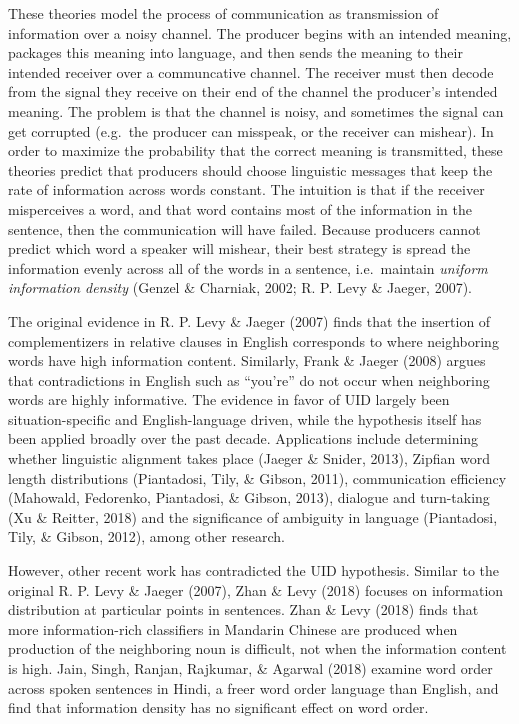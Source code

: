 \documentclass[10pt, letterpaper]{article}
\begin{document}
These theories model the process of communication as transmission of
information over a noisy channel. The producer begins with an intended
meaning, packages this meaning into language, and then sends the meaning
to their intended receiver over a communcative channel. The receiver
must then decode from the signal they receive on their end of the
channel the producer's intended meaning. The problem is that the channel
is noisy, and sometimes the signal can get corrupted (e.g.~the producer
can misspeak, or the receiver can mishear). In order to maximize the
probability that the correct meaning is transmitted, these theories
predict that producers should choose linguistic messages that keep the
rate of information across words constant. The intuition is that if the
receiver misperceives a word, and that word contains most of the
information in the sentence, then the communication will have failed.
Because producers cannot predict which word a speaker will mishear,
their best strategy is spread the information evenly across all of the
words in a sentence, i.e.~maintain \emph{uniform information density}
(Genzel \& Charniak, 2002; R. P. Levy \& Jaeger, 2007).

The original evidence in R. P. Levy \& Jaeger (2007) finds that the
insertion of complementizers in relative clauses in English corresponds
to where neighboring words have high information content. Similarly,
Frank \& Jaeger (2008) argues that contradictions in English such as
``you're'' do not occur when neighboring words are highly informative.
The evidence in favor of UID largely been situation-specific and
English-language driven, while the hypothesis itself has been applied
broadly over the past decade. Applications include determining whether
linguistic alignment takes place (Jaeger \& Snider, 2013), Zipfian word
length distributions (Piantadosi, Tily, \& Gibson, 2011), communication
efficiency (Mahowald, Fedorenko, Piantadosi, \& Gibson, 2013), dialogue
and turn-taking (Xu \& Reitter, 2018) and the significance of ambiguity
in language (Piantadosi, Tily, \& Gibson, 2012), among other research.

However, other recent work has contradicted the UID hypothesis. Similar
to the original R. P. Levy \& Jaeger (2007), Zhan \& Levy (2018) focuses
on information distribution at particular points in sentences. Zhan \&
Levy (2018) finds that more information-rich classifiers in Mandarin
Chinese are produced when production of the neighboring noun is
difficult, not when the information content is high. Jain, Singh,
Ranjan, Rajkumar, \& Agarwal (2018) examine word order across spoken
sentences in Hindi, a freer word order language than English, and find
that information density has no significant effect on word order.
\end{document}

